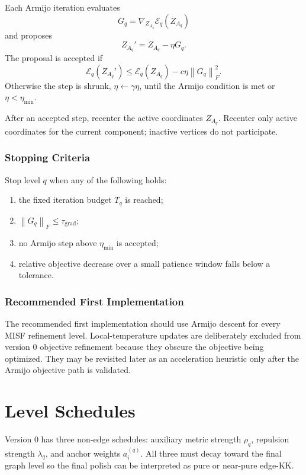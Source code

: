 \documentclass[11pt]{article}
\newcommand{\norm}[1]{\left\lVert #1 \right\rVert}
\begin{document}
Each Armijo iteration evaluates
\[
  G_q = \nabla_{Z_{A_q}}\mathcal{E}_q(Z_{A_q})
\]
and proposes
\[
  Z_{A_q}' = Z_{A_q} - \eta G_q.
\]
The proposal is accepted if
\[
  \mathcal{E}_q(Z_{A_q}')
  \le
  \mathcal{E}_q(Z_{A_q})
  -
  c\eta\norm{G_q}_F^2.
\]
Otherwise the step is shrunk, \(\eta\leftarrow\gamma\eta\), until the Armijo
condition is met or \(\eta<\eta_{\min}\).

After an accepted step, recenter the active coordinates \(Z_{A_q}\). Recenter
only active coordinates for the current component; inactive vertices do not
participate.

\subsubsection{Stopping Criteria}

Stop level \(q\) when any of the following holds:
\begin{enumerate}[leftmargin=2em]
  \item the fixed iteration budget \(T_q\) is reached;
  \item \(\norm{G_q}_F \le \tau_{\mathrm{grad}}\);
  \item no Armijo step above \(\eta_{\min}\) is accepted;
  \item relative objective decrease over a small patience window falls below a
  tolerance.
\end{enumerate}

\subsubsection{Recommended First Implementation}

The recommended first implementation should use Armijo descent for every MISF
refinement level. Local-temperature updates are deliberately excluded from
version 0 objective refinement because they obscure the objective being
optimized. They may be revisited later as an acceleration heuristic only after
the Armijo objective path is validated.

\section{Level Schedules}

Version 0 has three non-edge schedules: auxiliary metric strength \(\rho_q\),
repulsion strength \(\lambda_q\), and anchor weights \(a_i^{(q)}\). All three
must decay toward the final graph level so the final polish can be interpreted
as pure or near-pure edge-KK.
\end{document}
